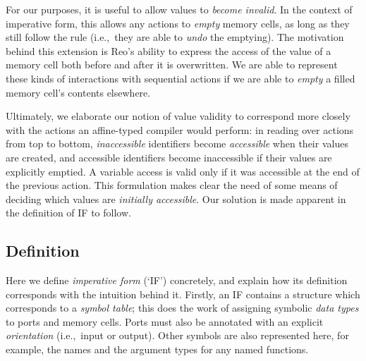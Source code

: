 For our purposes, it is useful to allow values to \textit{become invalid}. In the context of imperative form, this allows any actions to \textit{empty} memory cells, as long as they still follow the rule (i.e.,\ they are able to \textit{undo} the emptying). The motivation behind this extension is Reo's ability to express the access of the value of a memory cell both before and after it is overwritten. We are able to represent these kinds of interactions with sequential actions if we are able to \textit{empty} a filled memory cell's contents elsewhere. 

Ultimately, we elaborate our notion of value validity to correspond more closely with the actions an affine-typed compiler would perform: in reading over actions from top to bottom, \textit{inaccessible} identifiers become \textit{accessible} when their values are created, and accessible identifiers become inaccessible if their values are explicitly emptied. A variable access is valid only if it was accessible at the end of the previous action. This formulation makes clear the need of some means of deciding which values are \textit{initially accessible}. Our solution is made apparent in the definition of IF to follow.

\subsection{Definition}
\label{sec:imperative_form_definition}
Here we define \textit{imperative form} (`IF') concretely, and explain how its definition corresponds with the intuition behind it. Firstly, an IF contains a structure which corresponds to a \textit{symbol table}; this does the work of assigning symbolic \textit{data types} to ports and memory cells. Ports must also be annotated with an explicit \textit{orientation} (i.e.,\ input or output). Other symbols are also represented here, for example, the names and the argument types for any named functions.

